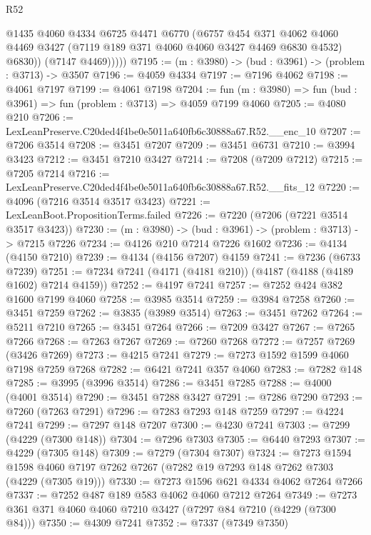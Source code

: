 \begin{lexlean}{R52}
\begin{coremodule}
              @1435
              @4060
              @4334
              @6725
              @4471
              @6770
              (@6757
                @454
                @371
                @4062
                @4060
                @4469
                @3427
                (@7119 @189 @371 @4060 @4060 @3427 @4469 @6830 @4532)
                @6830))
            (@7147 @4469)))))
@7195 := (m : @3980) -> (bud : @3961) -> (problem : @3713) -> @3507
@7196 := @4059 @4334
@7197 := @7196 @4062
@7198 := @4061 @7197
@7199 := @4061 @7198
@7204 := fun (m : @3980) => fun (bud : @3961) => fun (problem : @3713) => @4059 @7199 @4060
@7205 := @4080 @210
@7206 := LexLeanPreserve.C20ded4f4be0e5011a640fb6c30888a67.R52.__enc_10
@7207 := @7206 @3514
@7208 := @3451 @7207
@7209 := @3451 @6731
@7210 := @3994 @3423
@7212 := @3451 @7210 @3427
@7214 := @7208 (@7209 @7212)
@7215 := @7205 @7214
@7216 := LexLeanPreserve.C20ded4f4be0e5011a640fb6c30888a67.R52.__fits_12
@7220 := @4096 (@7216 @3514 @3517 @3423)
@7221 := LexLeanBoot.PropositionTerms.failed
@7226 := @7220 (@7206 (@7221 @3514 @3517 @3423))
@7230 := (m : @3980) -> (bud : @3961) -> (problem : @3713) -> @7215 @7226
@7234 := @4126 @210 @7214 @7226 @1602
@7236 := @4134 (@4150 @7210)
@7239 := @4134 (@4156 @7207) @4159
@7241 := @7236 (@6733 @7239)
@7251 := @7234 @7241 (@4171 (@4181 @210)) (@4187 (@4188 (@4189 @1602) @7214 @4159))
@7252 := @4197 @7241
@7257 := @7252 @424 @382 @1600 @7199 @4060
@7258 := @3985 @3514
@7259 := @3984 @7258
@7260 := @3451 @7259
@7262 := @3835 (@3989 @3514)
@7263 := @3451 @7262
@7264 := @5211 @7210
@7265 := @3451 @7264
@7266 := @7209 @3427
@7267 := @7265 @7266
@7268 := @7263 @7267
@7269 := @7260 @7268
@7272 := @7257 @7269 (@3426 @7269)
@7273 := @4215 @7241
@7279 := @7273 @1592 @1599 @4060 @7198 @7259 @7268
@7282 := @6421 @7241 @357 @4060
@7283 := @7282 @148
@7285 := @3995 (@3996 @3514)
@7286 := @3451 @7285
@7288 := @4000 (@4001 @3514)
@7290 := @3451 @7288 @3427
@7291 := @7286 @7290
@7293 := @7260 (@7263 @7291)
@7296 := @7283 @7293 @148 @7259
@7297 := @4224 @7241
@7299 := @7297 @148 @7207
@7300 := @4230 @7241
@7303 := @7299 (@4229 (@7300 @148))
@7304 := @7296 @7303
@7305 := @6440 @7293
@7307 := @4229 (@7305 @148)
@7309 := @7279 (@7304 @7307)
@7324 := @7273
    @1594
    @1598
    @4060
    @7197
    @7262
    @7267
    (@7282 @19 @7293 @148 @7262 @7303 (@4229 (@7305 @19)))
@7330 := @7273 @1596 @621 @4334 @4062 @7264 @7266
@7337 := @7252 @487 @189 @583 @4062 @4060 @7212 @7264
@7349 := @7273 @361 @371 @4060 @4060 @7210 @3427 (@7297 @84 @7210 (@4229 (@7300 @84)))
@7350 := @4309 @7241
@7352 := @7337 (@7349 @7350)

\end{coremodule}
\end{lexlean}
